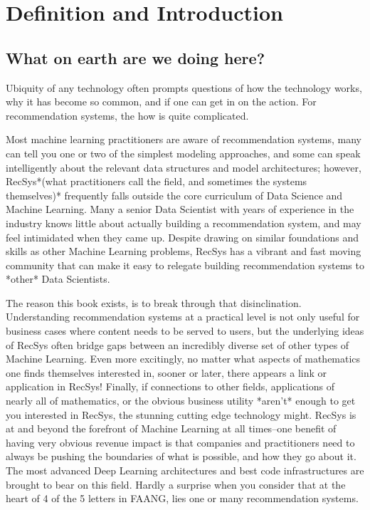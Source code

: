 \chapter{Definition and Introduction}
\label{ch:introduction}

\section{What on earth are we doing here?}

Ubiquity of any technology often prompts questions of how the technology works, why it has become so common, and if one can get in on the action. For recommendation systems, the how is quite complicated. 

Most machine learning practitioners are aware of recommendation systems, many can tell you one or two of the simplest modeling approaches, and some can speak intelligently about the relevant data structures and model architectures; however, RecSys*(what practitioners call the field, and sometimes the systems themselves)* frequently falls outside the core curriculum of Data Science and Machine Learning. Many a senior Data Scientist with years of experience in the industry knows little about actually building a recommendation system, and may feel intimidated when they came up. Despite drawing on similar foundations and skills as other Machine Learning problems, RecSys has a vibrant and fast moving community that can make it easy to relegate building recommendation systems to *other* Data Scientists.

The reason this book exists, is to break through that disinclination. Understanding recommendation systems at a practical level is not only useful for business cases where content needs to be served to users, but the underlying ideas of RecSys often bridge gaps between an incredibly diverse set of other types of Machine Learning. Even more excitingly, no matter what aspects of mathematics one finds themselves interested in, sooner or later, there appears a link or application in RecSys! Finally, if connections to other fields, applications of nearly all of mathematics, or the obvious business utility *aren't* enough to get you interested in RecSys, the stunning cutting edge technology might. RecSys is at and beyond the forefront of Machine Learning at all times–one benefit of having very obvious revenue impact is that companies and practitioners need to always be pushing the boundaries of what is possible, and how they go about it. The most advanced Deep Learning architectures and best code infrastructures are brought to bear on this field. Hardly a surprise when you consider that at the heart of 4 of the 5 letters in FAANG, lies one or many recommendation systems.

